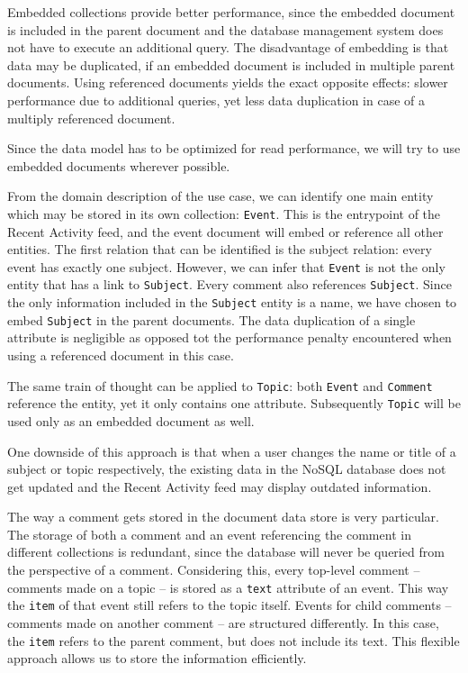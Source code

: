 Embedded collections provide better performance, since the embedded document is included in the parent document and the database management system does not have to execute an additional query.
The disadvantage of embedding is that data may be duplicated, if an embedded document is included in multiple parent documents.
Using referenced documents yields the exact opposite effects: slower performance due to additional queries, yet less data duplication in case of a multiply referenced document.

Since the data model has to be optimized for read performance, we will try to use embedded documents wherever possible.

From the domain description of the use case, we can identify one main entity which may be stored in its own collection: \texttt{Event}.
This is the entrypoint of the Recent Activity feed, and the event document will embed or reference all other entities.
The first relation that can be identified is the subject relation: every event has exactly one subject.
However, we can infer that \texttt{Event} is not the only entity that has a link to \texttt{Subject}.
Every comment also references \texttt{Subject}.
Since the only information included in the \texttt{Subject} entity is a name, we have chosen to embed \texttt{Subject} in the parent documents.
The data duplication of a single attribute is negligible as opposed tot the performance penalty encountered when using a referenced document in this case.

The same train of thought can be applied to \texttt{Topic}: both \texttt{Event} and \texttt{Comment} reference the entity, yet it only contains one attribute.
Subsequently \texttt{Topic} will be used only as an embedded document as well.

One downside of this approach is that when a user changes the name or title of a subject or topic respectively, the existing data in the NoSQL database does not get updated and the Recent Activity feed may display outdated information.

The way a comment gets stored in the document data store is very particular.
The storage of both a comment and an event referencing the comment in different collections is redundant, since the database will never be queried from the perspective of a comment.
Considering this, every top-level comment -- comments made on a topic -- is stored as a \texttt{text} attribute of an event.
This way the \texttt{item} of that event still refers to the topic itself.
Events for child comments -- comments made on another comment -- are structured differently.
In this case, the \texttt{item} refers to the parent comment, but does not include its text.
This flexible approach allows us to store the information efficiently.

